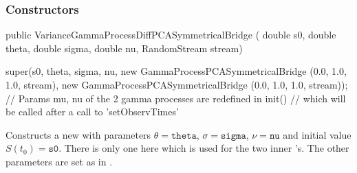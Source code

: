 \subsubsection* {Constructors}
\begin{code}

public VarianceGammaProcessDiffPCASymmetricalBridge (
                                               double s0, double theta,
                                               double sigma, double nu,
                                               RandomStream stream) \begin{hide} {
    super(s0, theta, sigma, nu, new GammaProcessPCASymmetricalBridge (0.0, 1.0, 1.0, stream),
	  new GammaProcessPCASymmetricalBridge (0.0, 1.0, 1.0, stream));
    // Params mu, nu of the 2 gamma processes are redefined in init()
    // which will be called after a call to 'setObservTimes'
}
\end{hide}
\end{code}
\begin{tabb}Constructs a new
 with
parameters  $\theta = \texttt{theta}$, $\sigma = \texttt{sigma}$, $\nu = \texttt{nu}$
and initial value $S(t_{0}) = \texttt{s0}$.  There is only
one  here which is
used for the two inner 's.  The other
parameters are set as in .
\end{tabb}

\begin{code}\begin{hide}
}
\end{hide}\end{code}




